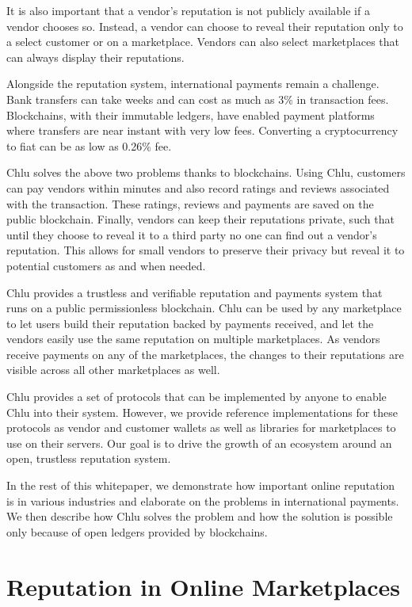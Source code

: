 \documentclass[a4paper]{article}
\begin{document}
It is also important that a vendor's reputation is not publicly
available if a vendor chooses so. Instead, a vendor can choose to
reveal their reputation only to a select customer or on a
marketplace. Vendors can also select marketplaces that can always
display their reputations.

Alongside the reputation system, international payments remain a
challenge. Bank transfers can take weeks and can cost as much as 3\%
in transaction fees. Blockchains, with their immutable ledgers, have
enabled payment platforms where transfers are near instant with very
low fees. Converting a cryptocurrency to fiat can be as low as 0.26\%
fee.

Chlu solves the above two problems thanks to blockchains. Using Chlu,
customers can pay vendors within minutes and also record ratings and
reviews associated with the transaction. These ratings, reviews and
payments are saved on the public blockchain. Finally, vendors can keep
their reputations private, such that until they choose to reveal it to
a third party no one can find out a vendor's reputation. This allows
for small vendors to preserve their privacy but reveal it to potential
customers as and when needed.

Chlu provides a trustless and verifiable reputation and payments
system that runs on a public permissionless blockchain. Chlu can be
used by any marketplace to let users build their reputation backed by
payments received, and let the vendors easily use the same reputation
on multiple marketplaces. As vendors receive payments on any of the
marketplaces, the changes to their reputations are visible across all
other marketplaces as well.

Chlu provides a set of protocols that can be implemented by anyone to
enable Chlu into their system. However, we provide reference
implementations for these protocols as vendor and customer wallets as
well as libraries for marketplaces to use on their servers. Our goal
is to drive the growth of an ecosystem around an open, trustless
reputation system.

In the rest of this whitepaper, we demonstrate how important online
reputation is in various industries and elaborate on the problems in
international payments. We then describe how Chlu solves the problem
and how the solution is possible only because of open ledgers provided
by blockchains.

\section{Reputation in Online Marketplaces}
\end{document}
